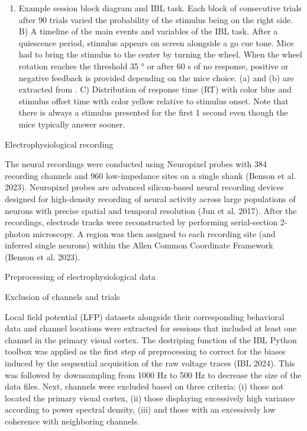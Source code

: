 \documentclass[
  letterpaper,
  DIV=11,
  numbers=noendperiod]{scrartcl}
\providecommand{\tightlist}{%
  \setlength{\itemsep}{0pt}\setlength{\parskip}{0pt}}\usepackage{longtable,booktabs,array}
\begin{document}
\begin{enumerate}
\def\labelenumi{\alph{enumi})}
\tightlist
\item
  Example session block diagram and IBL task. Each block of consecutive
  trials after 90 trials varied the probability of the stimulus being on
  the right side. B) A timeline of the main events and variables of the
  IBL task. After a quiescence period, stimulus appears on screen
  alongside a go cue tone. Mice had to bring the stimulus to the center
  by turning the wheel. When the wheel rotation reaches the threshold 35
  ° or after 60 s of no response, positive or negative feedback is
  provided depending on the mice choice. (a) and (b) are extracted from
  . C) Distribution of response time (RT) with color blue and stimulus
  offset time with color yellow relative to stimulus onset. Note that
  there is always a stimulus presented for the first 1 second even
  though the mice typically answer sooner.~
\end{enumerate}

Electrophysiological recording

The neural recordings were conducted using Neuropixel probes with 384
recording channels and 960 low-impedance sites on a single shank (Benson
et al. 2023). Neuropixel probes are advanced silicon-based neural
recording devices designed for high-density recording of neural activity
across large populations of neurons with precise spatial and temporal
resolution (Jun et al. 2017). After the recordings, electrode tracks
were reconstructed by performing serial-section 2-photon microscopy. A
region was then assigned to each recording site (and inferred single
neurons) within the Allen Common Coordinate Framework (Benson et al.
2023).

Preprocessing of electrophysiological data

Exclusion of channels and trials

Local field potential (LFP) datasets alongside their corresponding
behavioral data and channel locations were extracted for sessions that
included at least one channel in the primary visual cortex. The
destriping function of the IBL Python toolbox was applied as the first
step of preprocessing to correct for the biases induced by the
sequential acquisition of the raw voltage traces (IBL 2024). This was
followed by downsampling from 1000 Hz to 500 Hz to decrease the size of
the data files. Next, channels were excluded based on three criteria:
(i) those not located the primary visual cortex, (ii) those displaying
excessively high variance according to power spectral density, (iii) and
those with an excessively low coherence with neighboring channels.
\end{document}
